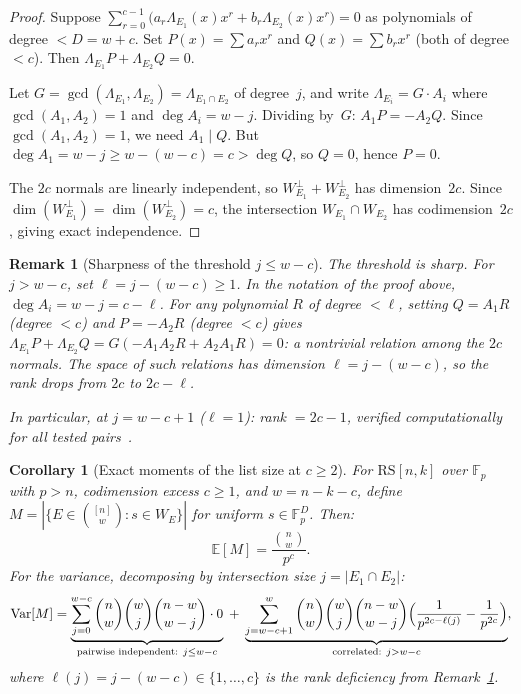 \documentclass[11pt]{article}
\newtheorem{corollary}[theorem]{Corollary}
\newtheorem{remark}[theorem]{Remark}
\newcommand{\FF}{\mathbb{F}}
\newcommand{\RS}{\mathrm{RS}}
\newcommand{\EE}{\mathbb{E}}
\DeclareMathOperator{\Var}{Var}
\begin{document}
\begin{proof}
Suppose $\sum_{r=0}^{c-1} \bigl(a_r \Lambda_{E_1}(x) x^r + b_r \Lambda_{E_2}(x) x^r\bigr) = 0$ as polynomials of degree $< D = w + c$. Set $P(x) = \sum a_r x^r$ and $Q(x) = \sum b_r x^r$ (both of degree $< c$). Then $\Lambda_{E_1} P + \Lambda_{E_2} Q = 0$.

Let $G = \gcd(\Lambda_{E_1}, \Lambda_{E_2}) = \Lambda_{E_1 \cap E_2}$ of degree~$j$, and write $\Lambda_{E_i} = G \cdot A_i$ where $\gcd(A_1, A_2) = 1$ and $\deg A_i = w - j$. Dividing by~$G$: $A_1 P = -A_2 Q$. Since $\gcd(A_1, A_2) = 1$, we need $A_1 \mid Q$. But $\deg A_1 = w - j \geq w - (w - c) = c > \deg Q$, so $Q = 0$, hence $P = 0$.

The $2c$ normals are linearly independent, so $W_{E_1}^\perp + W_{E_2}^\perp$ has dimension~$2c$. Since $\dim(W_{E_1}^\perp) = \dim(W_{E_2}^\perp) = c$, the intersection $W_{E_1} \cap W_{E_2}$ has codimension~$2c$, giving exact independence.
\end{proof}

\begin{remark}[Sharpness of the threshold $j \leq w - c$]
\label{rem:threshold-sharp}
The threshold is sharp. For $j > w - c$, set $\ell = j - (w-c) \geq 1$. In the notation of the proof above, $\deg A_i = w - j = c - \ell$. For any polynomial $R$ of degree $< \ell$, setting $Q = A_1 R$ (degree $< c$) and $P = -A_2 R$ (degree $< c$) gives $\Lambda_{E_1} P + \Lambda_{E_2} Q = G(-A_1 A_2 R + A_2 A_1 R) = 0$: a nontrivial relation among the $2c$ normals. The space of such relations has dimension $\ell = j - (w-c)$, so the rank drops from $2c$ to $2c - \ell$.

In particular, at $j = w - c + 1$ ($\ell = 1$): rank $= 2c - 1$, verified computationally for all tested pairs~\cite{CompanionRepo}.
\end{remark}

\begin{corollary}[Exact moments of the list size at $c \geq 2$]
\label{cor:moments-c}
For $\RS[n,k]$ over $\FF_p$ with $p > n$, codimension excess $c \geq 1$, and $w = n-k-c$, define $M = |\{E \in \binom{[n]}{w} : s \in W_E\}|$ for uniform $s \in \FF_p^D$. Then:
$$\EE[M] = \frac{\binom{n}{w}}{p^c}.$$
For the variance, decomposing by intersection size $j = |E_1 \cap E_2|$:
\begin{equation}
\label{eq:var-decomp}
\Var[M] = \underbrace{\sum_{j=0}^{w-c} \binom{n}{w} \binom{w}{j}\binom{n-w}{w-j} \cdot 0}_{\text{pairwise independent: } j \leq w-c} \;+\; \underbrace{\sum_{j=w-c+1}^{w} \binom{n}{w}\binom{w}{j}\binom{n-w}{w-j}\Bigl(\frac{1}{p^{2c-\ell(j)}} - \frac{1}{p^{2c}}\Bigr)}_{\text{correlated: } j > w-c},
\end{equation}
where $\ell(j) = j - (w-c) \in \{1, \ldots, c\}$ is the rank deficiency from Remark~\ref{rem:threshold-sharp}.
\end{corollary}
\end{document}
